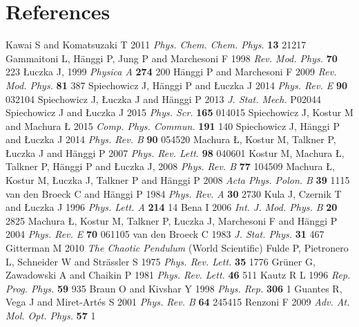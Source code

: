 \documentclass[12pt]{iopart}
\begin{document}
\section*{References}
\begin{thebibliography}{99}
Kawai S and Komatsuzaki T 2011 \textit{Phys. Chem. Chem. Phys.} \textbf{13} 21217
Gammaitoni L, H\"{a}nggi P, Jung P and Marchesoni F 1998 \textit{Rev. Mod. Phys.} \textbf{70} 223
{\L}uczka J,  1999 \textit{Physica A} \textbf{274} 200
H\"anggi P and Marchesoni F 2009 \textit{Rev. Mod. Phys.} \textbf{81} 387
Spiechowicz J, H\"anggi P and {\L}uczka J 2014 \textit{Phys. Rev. E} \textbf{90} 032104
Spiechowicz J, {\L}uczka J and H\"anggi P 2013 \textit{J. Stat. Mech.} P02044
Spiechowicz J and {\L}uczka J 2015 \textit{Phys. Scr.} \textbf{165} 014015
Spiechowicz J, Kostur M and Machura {\L} 2015 \textit{Comp. Phys. Commun.} \textbf{191} 140
Spiechowicz J, H\"anggi P and {\L}uczka J 2014 \textit{Phys. Rev. B} \textbf{90} 054520
Machura {\L}, Kostur M, Talkner P, {\L}uczka J and H\"anggi P 2007 \textit{Phys. Rev. Lett.} {\bf 98} 040601
Kostur M, Machura {\L}, Talkner P, H\"anggi P and {\L}uczka J, 2008 \textit{Phys. Rev. B} \textbf{77} 104509
Machura {\L}, Kostur M, {\L}uczka J, Talkner P and H\"anggi P 2008 \textit{Acta Phys. Polon. B} {\bf 39} 1115
van den Broeck C and H\"anggi P 1984 \textit{Phys. Rev. A} \textbf{30} 2730
Kula J, Czernik T and {\L}uczka J 1996 \textit{Phys. Lett. A} \textbf{214} 14
Bena I 2006 \textit{Int. J. Mod. Phys. B} \textbf{20} 2825
Machura {\L}, Kostur M, Talkner P, {\L}uczka J, Marchesoni F and H\"anggi P 2004 \textit{Phys. Rev. E} \textbf{70} 061105
van den Broeck C 1983 \textit{J. Stat. Phys.} \textbf{31} 467
Gitterman M 2010 \textit{The Chaotic Pendulum} (World Scientific)
Fulde P, Pietronero L, Schneider W and Str\"assler S 1975 \textit{Phys. Rev. Lett.} \textbf{35} 1776
Gr\"uner G, Zawadowski A and Chaikin P 1981 \textit{Phys. Rev. Lett.} \textbf{46} 511
Kautz R L 1996 \textit{Rep. Prog. Phys.} \textbf{59} 935
Braun O and Kivshar Y 1998 \textit{Phys. Rep.} \textbf{306} 1
Guantes R, Vega J and Miret-Art\'es S 2001 \textit{Phys. Rev. B} \textbf{64} 245415
 Renzoni F 2009   \textit{Adv. At. Mol. Opt. Phys.} \textbf{ 57}  1  


\end{thebibliography}
\end{document}
